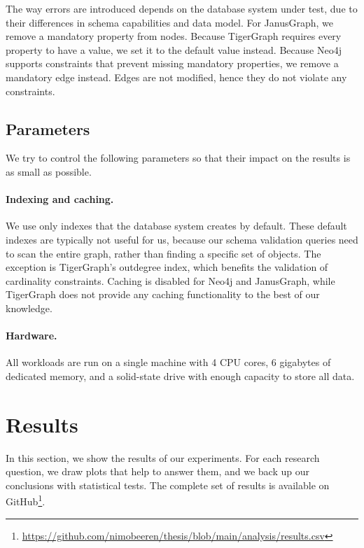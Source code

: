 \documentclass{report}
\theoremstyle{definition}
\begin{document}
The way errors are introduced depends on the database system under test, due to their differences in schema capabilities and data model. For JanusGraph, we remove a mandatory property from nodes. Because TigerGraph requires every property to have a value, we set it to the default value instead. Because Neo4j supports constraints that prevent missing mandatory properties, we remove a mandatory edge instead. Edges are not modified, hence they do not violate any constraints.

\subsection{Parameters}

We try to control the following parameters so that their impact on the results is as small as possible.

\paragraph{Indexing and caching.} We use only indexes that the database system creates by default. These default indexes are typically not useful for us, because our schema validation queries need to scan the entire graph, rather than finding a specific set of objects. The exception is TigerGraph's outdegree index, which benefits the validation of cardinality constraints. Caching is disabled for Neo4j and JanusGraph, while TigerGraph does not provide any caching functionality to the best of our knowledge.

\paragraph{Hardware.} All workloads are run on a single machine with 4 CPU cores, 6 gigabytes of dedicated memory, and a solid-state drive with enough capacity to store all data.

\section{Results}

In this section, we show the results of our experiments. For each research question, we draw plots that help to answer them, and we back up our conclusions with statistical tests. The complete set of results is available on GitHub\footnote{\url{https://github.com/nimobeeren/thesis/blob/main/analysis/results.csv}}.
\end{document}
